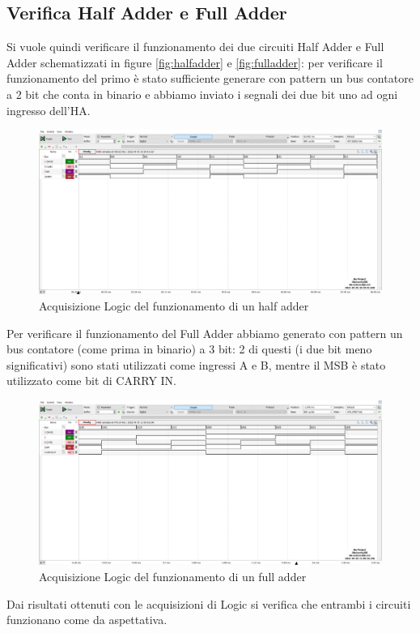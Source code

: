 \documentclass[10pt, a4paper, italian]{article}
\begin{document}
\subsection{Verifica Half Adder e Full Adder}
Si vuole quindi verificare il funzionamento dei due circuiti Half Adder e Full Adder schematizzati in figure \ref{fig:halfadder} e \ref{fig:fulladder}:
per verificare il funzionamento del primo è stato sufficiente generare con pattern
un bus contatore a 2 bit che conta in binario e abbiamo inviato i segnali dei due bit uno ad ogni ingresso dell'HA.
\begin{figure}[htbp]
	\centering
	\includegraphics[width=\textwidth]{half_time}
	\caption{Acquisizione Logic del funzionamento di un half adder}
\end{figure}
Per verificare il funzionamento del Full Adder abbiamo generato con pattern un bus
contatore (come prima in binario) a 3 bit: 2 di questi (i due bit meno significativi) sono stati utilizzati come ingressi A e B, mentre il MSB è stato utilizzato come bit di CARRY IN.
\begin{figure}[htbp]
	\centering
	\includegraphics[width=\textwidth]{full_time}
	\caption{Acquisizione Logic del funzionamento di un full adder}
\end{figure} 
Dai risultati ottenuti con le acquisizioni di Logic si verifica che entrambi i circuiti funzionano come da aspettativa.
\end{document}
